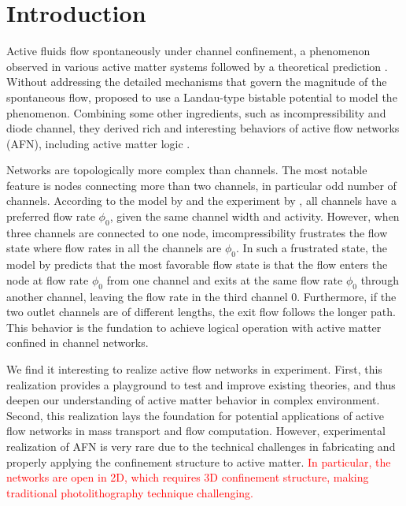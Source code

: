 \documentclass[%
10pt,
superscriptaddress,
twocolumn,
 amsmath,amssymb,
 aps,prx,
]{revtex4-2}
\begin{document}
\section{Introduction}

Active fluids flow spontaneously under channel confinement, a phenomenon observed in various active matter systems \cite{Lushi2014,Wioland2016,Wu2017,Duclos2017,Morin2018,Hardouin2020} followed by a theoretical prediction \cite{Voituriez2005}.
Without addressing the detailed mechanisms that govern the magnitude of the spontaneous flow, \citet{Woodhouse2017} proposed to use a Landau-type bistable potential to model the phenomenon. Combining some other ingredients, such as incompressibility and diode channel, they derived rich and interesting behaviors of active flow networks (AFN), including active matter logic \cite{Woodhouse2016,Woodhouse2017}.

Networks are topologically more complex than channels. 
The most notable feature is nodes connecting more than two channels, in particular odd number of channels. 
According to the model by \citet{Woodhouse2017} and the experiment by \citet{Morin2018}, all channels have a preferred flow rate $\phi_0$, given the same channel width and activity.
However, when three channels are connected to one node, imcompressibility frustrates the flow state where flow rates in all the channels are $\phi_0$.
In such a frustrated state, the model by \citet{Woodhouse2017} predicts that the most favorable flow state is that the flow enters the node at flow rate $\phi_0$ from one channel and exits at the same flow rate $\phi_0$ through another channel, leaving the flow rate in the third channel $0$.
Furthermore, if the two outlet channels are of different lengths, the exit flow follows the longer path.  
This behavior is the fundation to achieve logical operation with active matter confined in channel networks. 

We find it interesting to realize active flow networks in experiment. 
First, this realization provides a playground to test and improve existing theories, and thus deepen our understanding of active matter behavior in complex environment. 
Second, this realization lays the foundation for potential applications of active flow networks in mass transport and flow computation. 
However, experimental realization of AFN is very rare due to the technical challenges in fabricating and properly applying the confinement structure to active matter.
\textcolor{red}{In particular, the networks are open in 2D, which requires 3D confinement structure, making traditional photolithography technique challenging.}
\end{document}
